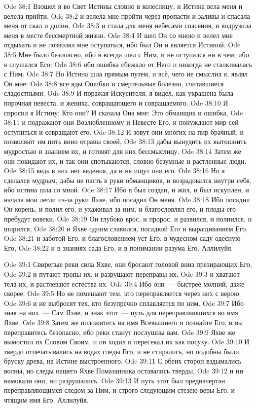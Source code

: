 \vs Ode 38:1
Взошел я во
Свет Истины словно в колесницу, и Истина вела меня и велела прийти,
\vs Ode 38:2
и велела мне
пройти через пропасти и заливы и спасала меня от скал и долин,
\vs Ode 38:3
и стала для
меня небесами спасения, и водрузила меня в месте бессмертной жизни.
\vs Ode 38:4
И шел Он со
мною и велел мне отдыхать и не позволял мне оступаться, ибо был Он и является
Истиной.
\vs Ode 38:5
Мне было
безопасно, ибо я всегда шел с Ним, и не оступался ни в чем, ибо я слушался Его;
\vs Ode 38:6
ибо ошибка
сбежало от Него и никогда не сталкивалась с Ним.
\vs Ode 38:7
Но Истина шла
прямым путем, и всё, чего не смыслил я, являл Он мне:
\vs Ode 38:8
все яды Ошибки
и смертельные болезни, считавшиеся сладостными.
\vs Ode 38:9
И поражая
Искусителя, я видел, как украшена была порочная невеста, и жениха, совращающего
и совращаемого.
\vs Ode 38:10
И спросил я
Истину: Кто они? И сказала Она мне: Это обманщик и ошибка,
\vs Ode 38:11
и подражают
они Возлюбленному и Невесте Его, и понуждают мир сей оступиться и совращают его.
\vs Ode 38:12
И зовут они
многих на пир брачный, и позволяют им пить вино отравы своей,
\vs Ode 38:13
дабы вынудить
их вытошнить мудростью и знанием их, и готовят для них бессмыслицу.
\vs Ode 38:14
Затем же они
покидают их, и так они спотыкаются, словно безумные и растленные люди,
\vs Ode 38:15
ведь в них
нет ведения, да и не ищут они его.
\vs Ode 38:16
Но я сделался
мудрым, дабы не пасть в руки обманщиков, и возрадовался внутри себя, ибо истина
шла со мной.
\vs Ode 38:17
Ибо я был
создан, и жил, и был искуплен, и начала мои легли из-за руки Яхве, ибо посадил
Он меня.
\vs Ode 38:18
Ибо посадил
Он корень, и полил его, и ухаживал за ним, и благословлял его, и плоды его
пребудут вовеки.
\vs Ode 38:19
Он глубоко
врос, и пророс, и развился, и полнился, и ширился,
\vs Ode 38:20
и Яхве одним
славился, посадкой Его и выращиванием Его,
\vs Ode 38:21
и заботой
Его, и благословением уст Его, в чудесном саду одесную Его,
\vs Ode 38:22
и в знаниях
сада Его, и в понимании разума Его.
Аллилуйя.

\vs Ode 39:1
Свирепые реки
сила Яхве, они бросают головой вниз презирающих Его,
\vs Ode 39:2
и путают тропы
их, и разрушают переправы их,
\vs Ode 39:3
и хватают тела
их, и растлевают естества их.
\vs Ode 39:4
Ибо они~---
быстрее молний, даже скорее.
\vs Ode 39:5
Но не помешают
тем, кто переправляется через них с верою
\vs Ode 39:6
и не выбросят
тех, кто безупречно сплавляется по ним.
\vs Ode 39:7
Ибо знак на
них~--- Сам Яхве, и знак этот~--- путь для переправляющихся во имя Яхве.
\vs Ode 39:8
Затем же
положитесь на имя Всевышнего и познайте Его, и вы переправитесь безопасно, ибо
реки станут послушны вам.
\vs Ode 39:9
Яхве же
вымостил их Словом Своим, и он ходил и пересекал их как посуху.
\vs Ode 39:10
И твердо
отпечатывались на водах следы Его, и не стирались, но подобны были бруску древа,
на Истине выстроенного.
\vs Ode 39:11
С обеих
сторон вздымались волны, но следы нашего Яхве Помазанника оставались тверды,
\vs Ode 39:12
и ни намокали
они, ни разрушались.
\vs Ode 39:13
И путь этот
был предначертан переправляющимся следом за Ним, и строго следующим стезею веры
Его, и чтящим имя Его.
Аллилуйя.

